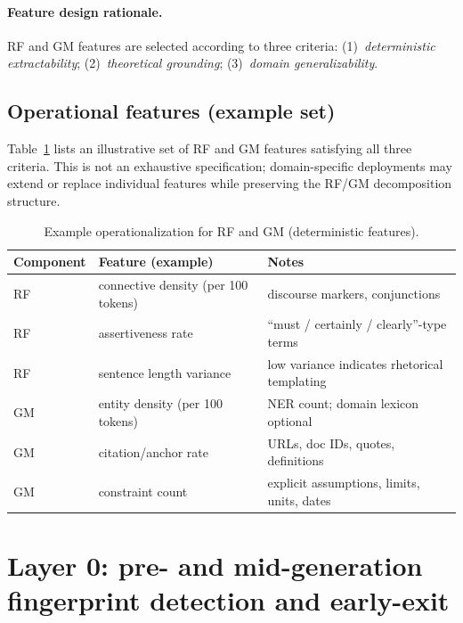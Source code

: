 \documentclass[11pt,a4paper]{article}
\begin{document}
\paragraph{Feature design rationale.}
RF and GM features are selected according to three criteria:
(1)~\textit{deterministic extractability};
(2)~\textit{theoretical grounding};
(3)~\textit{domain generalizability}.

\subsection{Operational features (example set)}

Table~\ref{tab:features} lists an illustrative set of RF and GM features
satisfying all three criteria. This is not an exhaustive specification;
domain-specific deployments may extend or replace individual features
while preserving the RF/GM decomposition structure.

\begin{table}[h]
\centering
\caption{Example operationalization for RF and GM (deterministic features).}
\label{tab:features}
\begin{tabular}{@{}lll@{}}
\toprule
Component & Feature (example) & Notes \\
\midrule
RF & connective density (per 100 tokens) & discourse markers, conjunctions \\
RF & assertiveness rate & ``must / certainly / clearly''-type terms \\
RF & sentence length variance & low variance indicates rhetorical templating \\
GM & entity density (per 100 tokens) & NER count; domain lexicon optional \\
GM & citation/anchor rate & URLs, doc IDs, quotes, definitions \\
GM & constraint count & explicit assumptions, limits, units, dates \\
\bottomrule
\end{tabular}
\end{table}

\section{Layer 0: pre- and mid-generation fingerprint detection and early-exit}
\end{document}
